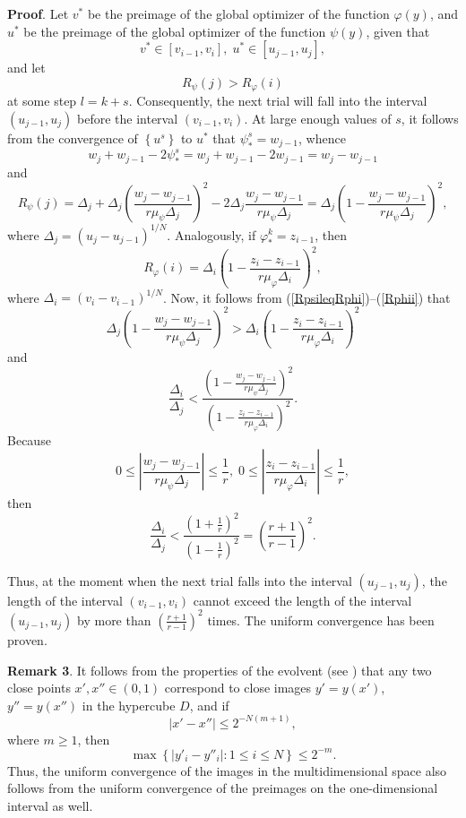 \documentclass[smallcondensed]{svjour3}     %
\begin{document}
\textbf{Proof}. Let $v^\ast$ be the preimage of the global optimizer of the function $\varphi(y)$, and $u^\ast$ be the preimage of the global optimizer of the function $\psi(y)$, given that 
\[
v^\ast \in \left[v_{i-1},v_i\right], \; u^\ast \in \left[u_{j-1},u_j\right],
\]
and let 
\begin{equation}\label{RpsileqRphi}
R_\psi(j) > R_\varphi(i)
\end{equation}
at some step $l=k+s$. Consequently, the next trial will fall into the interval $(u_{j-1},u_j)$ before the interval $(v_{i-1},v_i)$. At large enough values of $s$, it follows from the convergence of $\left\{u^s\right\}$ to $u^\ast$ that $\psi_\ast^s=w_{j-1}$, whence 
\[
w_j+w_{j-1}-2\psi_\ast^s=w_j+w_{j-1}-2w_{j-1}=w_j-w_{j-1}
\]
and
\begin{equation}\label{Rpsij}
R_\psi(j) =\Delta_j+\Delta_j\left(\frac{w_j-w_{j-1}}{r\mu_\psi\Delta_j}\right)^2-2\Delta_j\frac{w_j-w_{j-1}}{r\mu_\psi\Delta_j}=\Delta_j\left(1-\frac{w_j-w_{j-1}}{r\mu_\psi\Delta_j}\right)^2,
\end{equation}
where $\Delta_j=(u_j-u_{j-1})^{1/N}$. Analogously, if $\varphi_\ast^k=z_{i-1}$, then
\begin{equation}\label{Rphii}
R_\varphi(i) = \Delta_i\left(1-\frac{z_i-z_{i-1}}{r\mu_\varphi\Delta_i}\right)^2,
\end{equation}
where $\Delta_i=(v_i-v_{i-1})^{1/N}$. Now, it follows from (\ref{RpsileqRphi})--(\ref{Rphii}) that
\[
\Delta_j\left(1-\frac{w_j-w_{j-1}}{r\mu_\psi\Delta_j}\right)^2 > \Delta_i\left(1-\frac{z_i-z_{i-1}}{r\mu_\varphi\Delta_i}\right)^2
\]
and
\[
\frac{\Delta_i}{\Delta_j} <  \frac{\left(1-\frac{w_j-w_{j-1}}{r\mu_\psi\Delta_j}\right)^2}{\left(1-\frac{z_i-z_{i-1}}{r\mu_\varphi\Delta_i}\right)^2}.
\]
Because 
\[
0 \leq \left|\frac{w_j-w_{j-1}}{r\mu_\psi\Delta_j}\right| \leq \frac{1}{r}, \; 0 \leq \left|\frac{z_i-z_{i-1}}{r\mu_\varphi\Delta_i}\right| \leq \frac{1}{r},
\]
then
\[
\frac{\Delta_i}{\Delta_j} <  \frac{\left(1+\frac{1}{r}\right)^2}{\left(1-\frac{1}{r}\right)^2}=\left(\frac{r+1}{r-1}\right)^2.
\]

Thus, at the moment when the next trial falls into the interval $(u_{j-1},u_j)$, the length of the interval $(v_{i-1},v_i)$ cannot exceed the length of the interval $(u_{j-1},u_j)$ by more than $\left(\frac{r+1}{r-1}\right)^2$ times. The uniform convergence has been proven.

\textbf{Remark 3}. It follows from the properties of the evolvent (see \cite{Sergeyev2013}) that any two close points $x',x''\in (0,1)$ correspond to close images $y'=y(x')$, $y''=y(x'')$ in the hypercube $D$, and if
\[
\left|x'-x''\right|\leq 2^{-N(m+1)},
\]
where $m\geq 1$, then
\[
\max \left\{  \left|y'_i-y''_i\right|: 1\leq i \leq N \right\} \leq 2^{-m}.
\]
Thus, the uniform convergence of the images in the multidimensional space also follows from the uniform convergence of the preimages on the one-dimensional interval as well.
\end{document}
